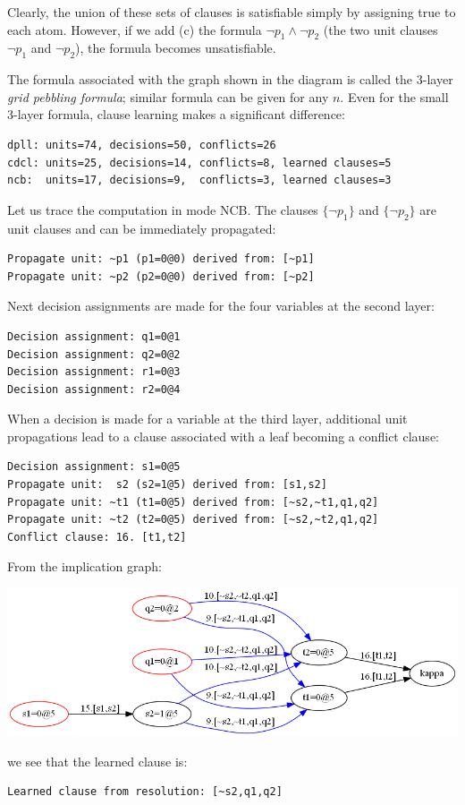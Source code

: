 \documentclass[11pt]{report}
\begin{document}
Clearly, the union of these sets of clauses is satisfiable simply by
assigning true to each atom. However, if we add (c) the formula $\neg
p_1 \wedge \neg p_2$ (the two unit clauses $\neg p_1$ and $\neg p_2$),
the formula becomes unsatisfiable.

The formula associated with the graph shown in the diagram is called the
$3$-layer \emph{grid pebbling formula}; similar formula can be given for
any $n$. Even for the small $3$-layer formula, clause learning makes a
significant difference:

\begin{verbatim}
dpll: units=74, decisions=50, conflicts=26
cdcl: units=25, decisions=14, conflicts=8, learned clauses=5
ncb:  units=17, decisions=9,  conflicts=3, learned clauses=3
\end{verbatim}

Let us trace the computation in mode NCB. The clauses $\{\neg p_1\}$ and
$\{\neg p_2\}$ are unit clauses and can be immediately propagated:

\begin{verbatim}
Propagate unit: ~p1 (p1=0@0) derived from: [~p1]
Propagate unit: ~p2 (p2=0@0) derived from: [~p2]
\end{verbatim}

Next decision assignments are made for the four variables at the second
layer:

\begin{verbatim}
Decision assignment: q1=0@1
Decision assignment: q2=0@2
Decision assignment: r1=0@3
Decision assignment: r2=0@4
\end{verbatim}

When a decision is made for a variable at the third layer, additional
unit propagations lead to a clause associated with a leaf becoming a
conflict clause:

\begin{verbatim}
Decision assignment: s1=0@5
Propagate unit:  s2 (s2=1@5) derived from: [s1,s2]
Propagate unit: ~t1 (t1=0@5) derived from: [~s2,~t1,q1,q2]
Propagate unit: ~t2 (t2=0@5) derived from: [~s2,~t2,q1,q2]
Conflict clause: 16. [t1,t2]
\end{verbatim}

From the implication graph:
\begin{center}
\includegraphics[keepaspectratio=true,width=\textwidth]{pebbles-color}
\end{center}
we see that the learned clause is:
\begin{verbatim}
Learned clause from resolution: [~s2,q1,q2]
\end{verbatim}
\end{document}
